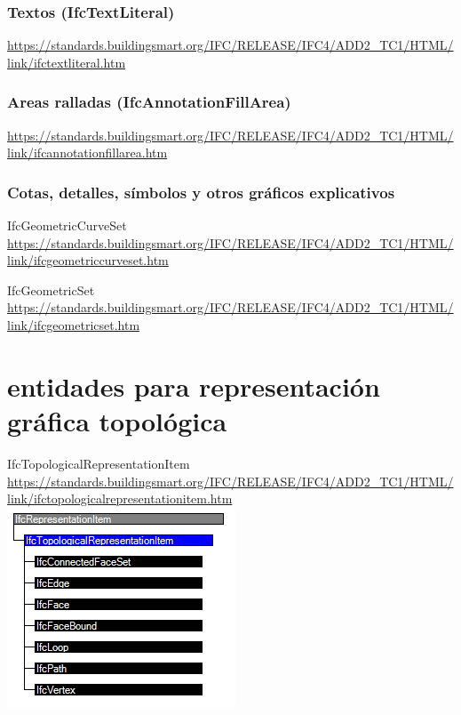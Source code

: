 \documentclass[spanish,12pt,a4paper,final,oneside]{book}
\begin{document}
\subsection{Textos (IfcTextLiteral)}
\url{https://standards.buildingsmart.org/IFC/RELEASE/IFC4/ADD2_TC1/HTML/link/ifctextliteral.htm}

\subsection{Areas ralladas (IfcAnnotationFillArea)}
\url{https://standards.buildingsmart.org/IFC/RELEASE/IFC4/ADD2_TC1/HTML/link/ifcannotationfillarea.htm}

\subsection{Cotas, detalles, símbolos y otros gráficos explicativos}
IfcGeometricCurveSet
\\ \url{https://standards.buildingsmart.org/IFC/RELEASE/IFC4/ADD2_TC1/HTML/link/ifcgeometriccurveset.htm}

IfcGeometricSet
\\ \url{https://standards.buildingsmart.org/IFC/RELEASE/IFC4/ADD2_TC1/HTML/link/ifcgeometricset.htm}







\chapter{entidades para representación gráfica topológica} \label{entidades_topologia}

IfcTopologicalRepresentationItem
\\ \url{https://standards.buildingsmart.org/IFC/RELEASE/IFC4/ADD2_TC1/HTML/link/ifctopologicalrepresentationitem.htm}
\\ \includegraphics[scale=1]{jerarquia de IfcTopologicalRepresentationItem}
\end{document}
